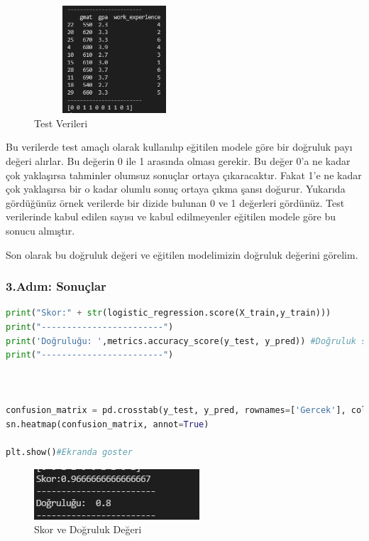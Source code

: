 \documentclass{article}
\begin{document}
\begin{figure}[htp]
    \centering
    \includegraphics[width=6cm, height=4cm]{3.png}
    \caption{Test Verileri}
    \label{fig:my_label}
\end{figure}
\newpage
Bu verilerde test amaçlı olarak kullanılıp eğitilen modele göre bir doğruluk payı değeri alırlar. Bu değerin 0 ile 1 arasında olması gerekir. Bu değer 0'a ne kadar çok yaklaşırsa tahminler olumsuz sonuçlar ortaya çıkaracaktır. Fakat 1'e ne kadar çok yaklaşırsa bir o kadar olumlu sonuç ortaya çıkma şansı doğurur. Yukarıda gördüğünüz örnek verilerde bir dizide bulunan 0 ve 1 değerleri gördünüz. Test verilerinde kabul edilen sayısı ve kabul edilmeyenler eğitilen modele göre bu sonucu almıştır.\par Son olarak bu doğruluk değeri ve eğitilen modelimizin doğruluk değerini görelim.
\subsubsection{3.Adım: Sonuçlar}
\begin{lstlisting}[language=Python, caption=Logistic Regression Sonuç Bastırımı]
print("Skor:" + str(logistic_regression.score(X_train,y_train)))
print("------------------------")
print('Doğruluğu: ',metrics.accuracy_score(y_test, y_pred)) #Doğruluk skoru
print("------------------------")



confusion_matrix = pd.crosstab(y_test, y_pred, rownames=['Gercek'], colnames=['Tahmin'])
sn.heatmap(confusion_matrix, annot=True)

plt.show()#Ekranda goster
\end{lstlisting}
\begin{figure}
    \centering
    \includegraphics{4.png}
    \caption{Skor ve Doğruluk Değeri}
    \label{fig:my_label}
\end{figure}
\end{document}

